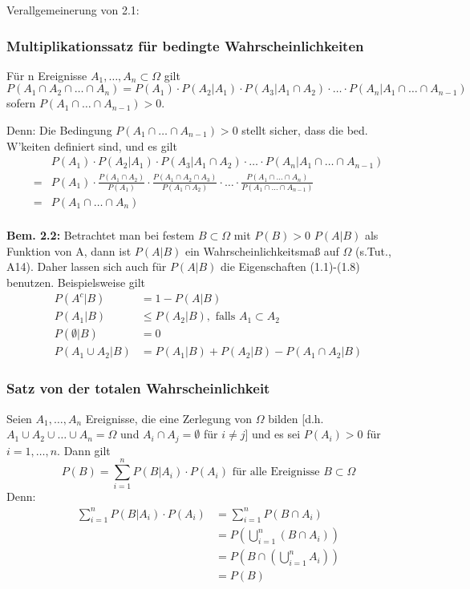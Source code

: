 \documentclass[a4paper,11pt]{article}
\begin{document}
\noindent Verallgemeinerung von 2.1:

\subsubsection{Multiplikationssatz für bedingte Wahrscheinlichkeiten}
\noindent Für n Ereignisse $A_1,\dots,A_n\subset\Omega$ gilt 
\[P(A_1\cap A_2\cap\dots\cap A_n)=P(A_1)\cdot P(A_2|A_1)\cdot P(A_3|A_1\cap A_2)\cdot\dots\cdot P(A_n|A_1\cap\dots\cap A_{n-1})\] 
sofern $P(A_1\cap\dots\cap A_{n-1})>0$.

\vspace{6pt}
\noindent Denn: Die Bedingung  $P(A_1\cap\dots\cap A_{n-1})>0$ stellt sicher, dass die bed. W'keiten definiert sind, 
und es gilt 
\begin{align*}
& P(A_1)\cdot P(A_2|A_1)\cdot P(A_3|A_1\cap A_2)\cdot\dots\cdot P(A_n|A_1\cap\dots\cap A_{n-1})\\
=& P(A_1)\cdot \frac{P(A_1\cap A_2)}{P(A_1)}\cdot \frac{P(A_1\cap A_2\cap A_3)}{P(A_1\cap A_2)}\cdot\dots\cdot \frac{P(A_1\cap\dots\cap A_n)}{P(A_1\cap\dots\cap A_{n-1})}\\
=& P(A_1\cap\dots\cap A_n)\\
\end{align*}

\vspace{6pt}
\noindent\textbf{Bem. 2.2:} Betrachtet man bei festem $B\subset\Omega$ mit $P(B)>0$ $P(A|B)$ als Funktion von A, dann ist $P(A|B)$ ein Wahrscheinlichkeitsmaß auf $\Omega$ (s.Tut., A14).
\newline Daher lassen sich auch für $P(A|B)$ die Eigenschaften (1.1)-(1.8) benutzen. Beispielsweise gilt
\begin{align*}
P(A^c|B) &= 1-P(A|B)\\
P(A_1|B) &\leq P(A_2|B), \text{ falls } A_1\subset A_2\\
P(\emptyset|B) &= 0\\
P(A_1\cup A_2|B)&=P(A_1|B)+P(A_2|B)-P(A_1\cap A_2|B)
\end{align*}

\subsubsection{Satz von der totalen Wahrscheinlichkeit}
\noindent Seien $A_1,\dots,A_n$ Ereignisse, die eine Zerlegung von $\Omega$ bilden [d.h. $A_1\cup A_2\cup\dots\cup A_n = \Omega$ und $A_i\cap A_j = \emptyset$ für $i\neq j$]
und es sei $P(A_i)>0$ für $i=1,\dots,n$. Dann gilt
\[P(B)=\sum_{i=1}^{n}P(B|A_i)\cdot P(A_i)\text{ für alle Ereignisse }B\subset\Omega\]
Denn: 
\begin{align*}
\sum_{i=1}^{n}P(B|A_i)\cdot P(A_i) &= \sum_{i=1}^{n}P(B\cap A_i)\\
&= P(\bigcup_{i=1}^{n}(B\cap A_i))\\
&= P(B\cap(\bigcup_{i=1}^{n}A_i))\\
&= P(B)
\end{align*}
\end{document}
